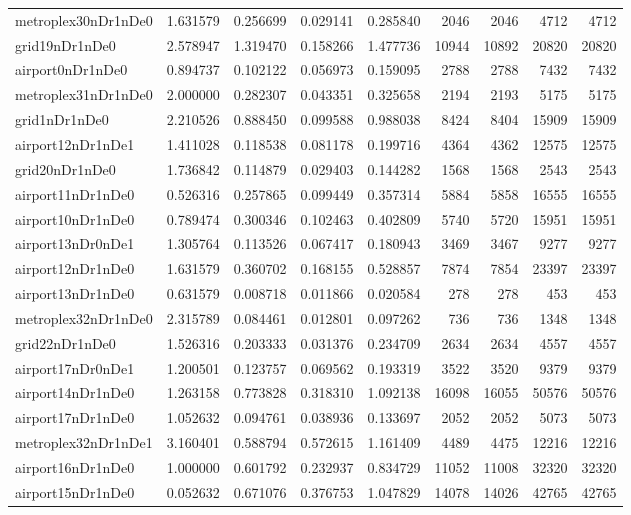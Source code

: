 \begin{longtable}{|l|r|r|r|r|r|r|r|r|}
metroplex30nDr1nDe0 & 1.631579 & 0.256699 & 0.029141 & 0.285840 & 2046 & 2046 & 4712 & 4712 \\
grid19nDr1nDe0 & 2.578947 & 1.319470 & 0.158266 & 1.477736 & 10944 & 10892 & 20820 & 20820 \\
airport0nDr1nDe0 & 0.894737 & 0.102122 & 0.056973 & 0.159095 & 2788 & 2788 & 7432 & 7432 \\
metroplex31nDr1nDe0 & 2.000000 & 0.282307 & 0.043351 & 0.325658 & 2194 & 2193 & 5175 & 5175 \\
grid1nDr1nDe0 & 2.210526 & 0.888450 & 0.099588 & 0.988038 & 8424 & 8404 & 15909 & 15909 \\
airport12nDr1nDe1 & 1.411028 & 0.118538 & 0.081178 & 0.199716 & 4364 & 4362 & 12575 & 12575 \\
grid20nDr1nDe0 & 1.736842 & 0.114879 & 0.029403 & 0.144282 & 1568 & 1568 & 2543 & 2543 \\
airport11nDr1nDe0 & 0.526316 & 0.257865 & 0.099449 & 0.357314 & 5884 & 5858 & 16555 & 16555 \\
airport10nDr1nDe0 & 0.789474 & 0.300346 & 0.102463 & 0.402809 & 5740 & 5720 & 15951 & 15951 \\
airport13nDr0nDe1 & 1.305764 & 0.113526 & 0.067417 & 0.180943 & 3469 & 3467 & 9277 & 9277 \\
airport12nDr1nDe0 & 1.631579 & 0.360702 & 0.168155 & 0.528857 & 7874 & 7854 & 23397 & 23397 \\
airport13nDr1nDe0 & 0.631579 & 0.008718 & 0.011866 & 0.020584 & 278 & 278 & 453 & 453 \\
metroplex32nDr1nDe0 & 2.315789 & 0.084461 & 0.012801 & 0.097262 & 736 & 736 & 1348 & 1348 \\
grid22nDr1nDe0 & 1.526316 & 0.203333 & 0.031376 & 0.234709 & 2634 & 2634 & 4557 & 4557 \\
airport17nDr0nDe1 & 1.200501 & 0.123757 & 0.069562 & 0.193319 & 3522 & 3520 & 9379 & 9379 \\
airport14nDr1nDe0 & 1.263158 & 0.773828 & 0.318310 & 1.092138 & 16098 & 16055 & 50576 & 50576 \\
airport17nDr1nDe0 & 1.052632 & 0.094761 & 0.038936 & 0.133697 & 2052 & 2052 & 5073 & 5073 \\
metroplex32nDr1nDe1 & 3.160401 & 0.588794 & 0.572615 & 1.161409 & 4489 & 4475 & 12216 & 12216 \\
airport16nDr1nDe0 & 1.000000 & 0.601792 & 0.232937 & 0.834729 & 11052 & 11008 & 32320 & 32320 \\
airport15nDr1nDe0 & 0.052632 & 0.671076 & 0.376753 & 1.047829 & 14078 & 14026 & 42765 & 42765 \\

\end{longtable}
